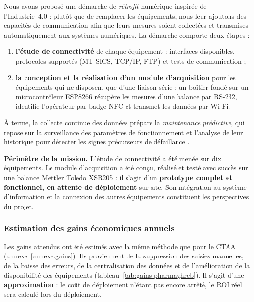 Nous avons proposé une démarche de \emph{rétrofit} numérique inspirée de l'Industrie~4.0 \citep{lee2015} : plutôt que de remplacer les équipements, nous leur ajoutons des capacités de communication afin que leurs mesures soient collectées et transmises automatiquement aux systèmes numériques. La démarche comporte deux étapes :
\begin{enumerate}
    \item \textbf{l'étude de connectivité} de chaque équipement : interfaces disponibles, protocoles supportés (\ac{MT-SICS}, \ac{TCP}/\ac{IP}, \ac{FTP}) et tests de communication ;
    \item \textbf{la conception et la réalisation d'un module d'acquisition} pour les équipements qui ne disposent que d'une liaison série : un boîtier fondé sur un microcontrôleur ESP8266 récupère les mesures d'une balance par \ac{RS-232}, identifie l'opérateur par badge \ac{NFC} et transmet les données par \ac{Wi-Fi}.
\end{enumerate}

À terme, la collecte continue des données prépare la \emph{maintenance prédictive}, qui repose sur la surveillance des paramètres de fonctionnement et l'analyse de leur historique pour détecter les signes précurseurs de défaillance \citep{mobley2002}.

\textbf{Périmètre de la mission.} L'étude de connectivité a été menée sur dix équipements. Le module d'acquisition a été conçu, réalisé et testé avec succès sur une balance Mettler Toledo XSR205 : il s'agit d'un \textbf{prototype complet et fonctionnel, en attente de déploiement} sur site. Son intégration au système d'information et la connexion des autres équipements constituent les perspectives du projet.

\subsubsection*{Estimation des gains économiques annuels}

Les gains attendus ont été estimés avec la même méthode que pour le \ac{CTAA} (annexe~\ref{annexe:gains}). Ils proviennent de la suppression des saisies manuelles, de la baisse des erreurs, de la centralisation des données et de l'amélioration de la disponibilité des équipements (tableau~\ref{tab:gains-pharmaghreb}). Il s'agit d'une \textbf{approximation} : le coût de déploiement n'étant pas encore arrêté, le \ac{ROI} réel sera calculé lors du déploiement.

